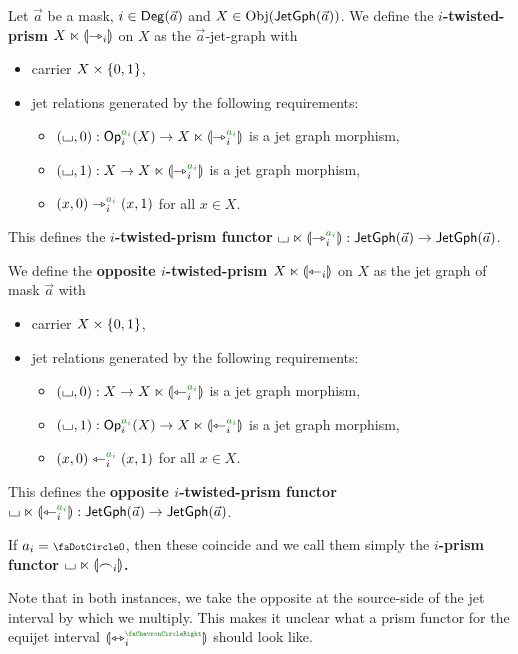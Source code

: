 \documentclass[a4paper]{memoir}
\begin{document}
\begin{definition} \label{def:prism}
	Let $\vec a$ be a mask, $i \in {\mathsf{Deg}}(\vec a)$ and $X \in \mathrm{Obj}(\mathsf{JetGph}(\vec a))$.
	We define the \textbf{$i$-twisted-prism $X \ltimes {\llparenthesis \rightarrowtriangle_i \rrparenthesis}$} on $X$ as the $\vec a$-jet-graph with
	\begin{itemize}
		\item carrier $X \times \mathopen{}\left\{ 0, 1 \right\}\mathclose{}$,
		\item jet relations generated by the following requirements:
		\begin{itemize}
			\item $(\loch, 0) : \Op_i\pmr{a_i}(X) \to X \multip \rival{\jet_i\pmr{a_i}}$ is a jet graph morphism,
			\item $(\loch, 1) : X \to X \multip \rival{\jet_i\pmr{a_i}}$ is a jet graph morphism,
			\item $(x, 0) \jet_i\pmr{a_i} (x, 1)$ for all $x \in X$.
		\end{itemize}
	\end{itemize}
	This defines the \textbf{$i$-twisted-prism functor} $\loch \multip \rival{\jet_i\pmr{a_i}} : \jetgph{\vec a} \to \jetgph{\vec a}$.
	
	We define the \textbf{opposite $i$-twisted-prism $X \ltimes {\llparenthesis \leftarrowtriangle_i \rrparenthesis}$} on $X$ as the jet graph of mask $\vec a$ with
	\begin{itemize}
		\item carrier $X \times \mathopen{}\left\{ 0, 1 \right\}\mathclose{}$,
		\item jet relations generated by the following requirements:
		\begin{itemize}
			\item $(\loch, 0) : X \to X \multip \rival{\tej_i\pmr{a_i}}$ is a jet graph morphism,
			\item $(\loch, 1) : \Op_i\pmr{a_i}(X) \to X \multip \rival{\tej_i\pmr{a_i}}$ is a jet graph morphism,
			\item $(x, 0) \tej_i\pmr{a_i} (x, 1)$ for all $x \in X$.
		\end{itemize}
	\end{itemize}
	This defines the \textbf{opposite $i$-twisted-prism functor} $\loch \multip \rival{\tej_i\pmr{a_i}} : \jetgph{\vec a} \to \jetgph{\vec a}$.
	
	If $a_i = \npolar$, then these coincide and we call them simply the \textbf{$i$-prism functor ${\llcorner\hspace{-.4ex}\lrcorner} \ltimes {\llparenthesis \frown_i \rrparenthesis}$.}
\end{definition}
Note that in both instances, we take the opposite at the source-side of the jet interval by which we multiply. This makes it unclear what a prism functor for the equijet interval $\rival{\equijet_i\pmr\ypolar}$ should look like.
\end{document}
